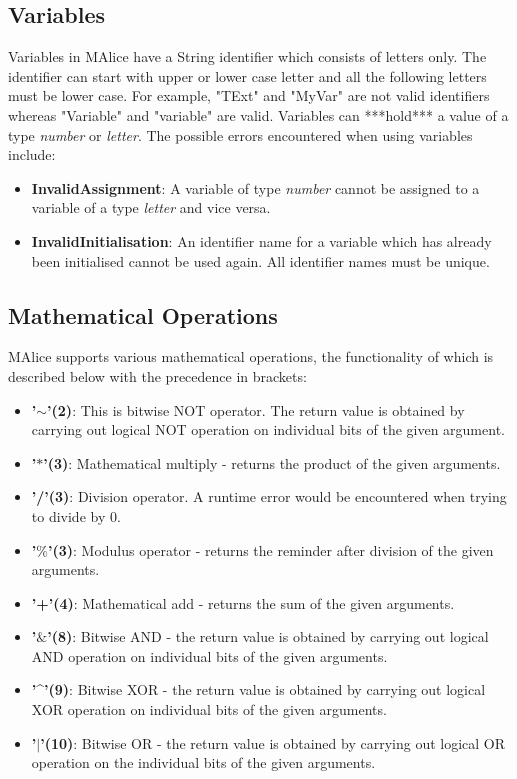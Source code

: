 \documentclass[a4wide, 11pt]{article}
\begin{document}
	\subsection{Variables}
		\label{sec:var}
			Variables in MAlice have a String identifier which consists of letters only.
			The identifier can start with upper or lower case letter and all the 
			following letters must be lower case. For example, "TExt" and "MyVar" are not 
			valid identifiers whereas "Variable" and "variable" are valid. Variables 
			can ***hold*** a value of a type \emph{number} or \emph{letter}. The possible errors encountered
			when using variables include:
			\begin{itemize}
				\item {\bf InvalidAssignment}: A variable of type \emph{number} cannot be 
					assigned to a variable of a type \emph{letter} and vice versa.
				\item {\bf InvalidInitialisation}: An identifier name for a variable which 
					has already been initialised cannot	be used again. All identifier names 
					must be unique.
			\end{itemize}
	
	\subsection{Mathematical Operations}
	\label{sec:mathOper}
		MAlice supports various mathematical operations, the functionality of which is 
		described below with the precedence in brackets:
		\begin{itemize}
			\item {\bf '$\mathtt{\sim}$'(2)}: This is bitwise NOT operator. The return value is obtained by carrying
				out logical NOT operation on individual bits of the given argument.
			\item {\bf '$\ast$'(3)}: Mathematical multiply - returns the product of the
				given arguments.
			\item {\bf '/'(3)}: Division operator. A runtime error would be encountered 
				when trying to	divide by 0.
			\item {\bf '$\%$'(3)}: Modulus operator - returns the reminder after division of 
				the given arguments.
			\item {\bf '+'(4)}: Mathematical add - returns the sum of the given arguments.
			\item {\bf '$\&$'(8)}: Bitwise AND - the return value is obtained by carrying out 
				logical AND operation on individual bits of the given arguments.
			\item {\bf '\^{ }'(9)}: Bitwise XOR - the return value is obtained by carrying out 
				logical XOR operation on individual bits of the given arguments.
			\item {\bf '$\mid$'(10)}: Bitwise OR - the return value is obtained by carrying out 
				logical OR operation on the individual bits of the given arguments.
		\end{itemize}
 
\end{document}
